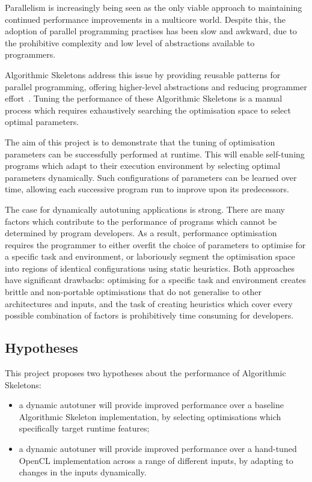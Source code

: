 Parallelism is increasingly being seen as the only viable approach to
maintaining continued performance improvements in a multicore
world. Despite this, the adoption of parallel programming practises
has been slow and awkward, due to the prohibitive complexity and low
level of abstractions available to programmers.

Algorithmic Skeletons address this issue by providing reusable
patterns for parallel programming, offering higher-level abstractions
and reducing programmer effort~\cite{Cole1989, Cole2004}. Tuning the
performance of these Algorithmic Skeletons is a manual process which
requires exhaustively searching the optimisation space to select
optimal parameters.

The aim of this project is to demonstrate that the tuning of
optimisation parameters can be successfully performed at runtime. This
will enable self-tuning programs which adapt to their execution
environment by selecting optimal parameters dynamically. Such
configurations of parameters can be learned over time, allowing each
successive program run to improve upon its predecessors.

The case for dynamically autotuning applications is strong. There are
many factors which contribute to the performance of programs which
cannot be determined by program developers.
As a result, performance optimisation requires the programmer to
either overfit the choice of parameters to optimise for a specific
task and environment, or laboriously segment the optimisation space
into regions of identical configurations using static heuristics. Both
approaches have significant drawbacks: optimising for a specific task
and environment creates brittle and non-portable optimisations that do
not generalise to other architectures and inputs, and the task of
creating heuristics which cover every possible combination of factors
is prohibitively time consuming for developers.

\subsection{Hypotheses}
This project proposes two hypotheses about the performance of
Algorithmic Skeletons:
\begin{itemize}
\item a dynamic autotuner will provide improved performance over a
  baseline Algorithmic Skeleton implementation, by selecting
  optimisations which specifically target runtime features;
\item a dynamic autotuner will provide improved performance over a
  hand-tuned OpenCL implementation across a range of different inputs,
  by adapting to changes in the inputs dynamically.
\end{itemize}

